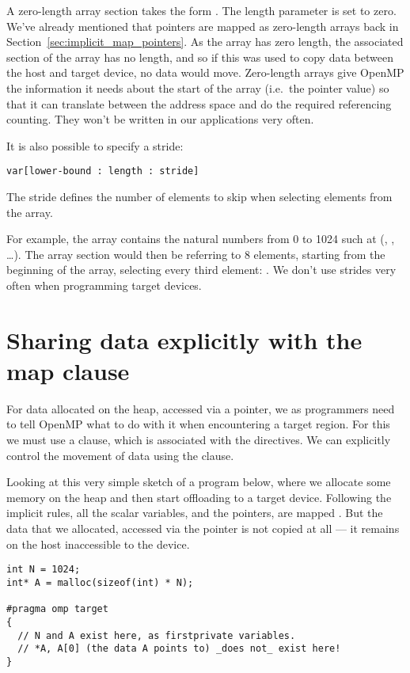 A zero-length array section takes the form . The length parameter is set to zero. We've already mentioned that pointers are mapped as zero-length arrays back in Section~\ref{sec:implicit_map_pointers}. As the array has zero length, the associated section of the array has no length, and so if this was used to copy data between the host and target device, no data would move. Zero-length arrays give OpenMP the information it needs about the start of the array (i.e.\ the pointer value) so that it can translate between the address space and do the required referencing counting. They won't be written in our applications very often.

It is also possible to specify a stride:
\begin{verbatim}
var[lower-bound : length : stride]
\end{verbatim}
The stride defines the number of elements to skip when selecting elements from the array.

For example, the array  contains the natural numbers from 0 to 1024 such at  (, , \dots).
The array section  would then be referring to 8 elements, starting from the beginning of the array, selecting every third element: .
We don't use strides very often when programming target devices.


\section{Sharing data explicitly with the map clause}
For data allocated on the heap, accessed via a pointer, we as programmers need to tell OpenMP what to do with it when encountering a target region.
For this we must use a  clause, which is associated with the  directives.
We can explicitly control the movement of data using the  clause.

Looking at this very simple sketch of a program below, where we allocate some memory on the heap and then start offloading to a target device.
Following the implicit rules, all the scalar variables, and the pointers, are mapped .
But the data that we allocated, accessed via the  pointer is not copied at all --- it remains on the host inaccessible to the device.

\begin{Verbatim}
int N = 1024;
int* A = malloc(sizeof(int) * N);

#pragma omp target
{
  // N and A exist here, as firstprivate variables.
  // *A, A[0] (the data A points to) _does not_ exist here!
}
\end{Verbatim}

